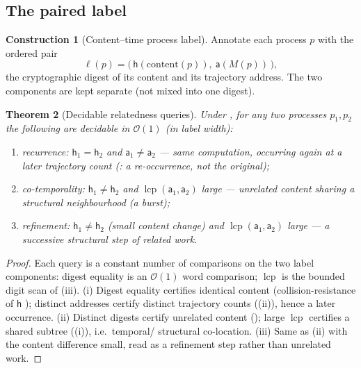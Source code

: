 \documentclass[twocolumn,10pt,a4paper]{article}
\theoremstyle{thmstyle}
\newtheorem{theorem}{Theorem}[section]
\theoremstyle{definition}
\newtheorem{construction}[theorem]{Construction}
\theoremstyle{remark}
\newcommand{\Mcount}{M}
\newcommand{\Addr}{\mathsf{a}}
\newcommand{\dig}{\mathsf{h}}
\newcommand{\lab}{\ell}
\DeclareMathOperator{\lcp}{lcp}
\begin{document}
\subsection{The paired label}

\begin{construction}[Content--time process label]
\label{con:paired}
Annotate each process $p$ with the ordered pair
\[
\lab(p)=\big(\,\dig(\mathrm{content}(p)),\ \Addr(\Mcount(p))\,\big),
\]
the cryptographic digest of its content and its trajectory address. The
two components are kept separate (not mixed into one digest).
\end{construction}

\begin{theorem}[Decidable relatedness queries]
\label{thm:queries}
Under , for any two processes $p_1,p_2$ the following are
decidable in $\mathcal{O}(1)$ (in label width):
\begin{enumerate}[label=\textup{(\roman*)},leftmargin=2.2em,itemsep=2pt]
\item \emph{recurrence:} $\dig_1=\dig_2$ and $\Addr_1\neq\Addr_2$ ---
same computation, occurring again at a later trajectory count
(: a re-occurrence, not the original);
\item \emph{co-temporality:} $\dig_1\neq\dig_2$ and
$\lcp(\Addr_1,\Addr_2)$ large --- unrelated content sharing a structural
neighbourhood (a burst);
\item \emph{refinement:} $\dig_1\neq\dig_2$ (small content change) and
$\lcp(\Addr_1,\Addr_2)$ large --- a successive structural step of related
work.
\end{enumerate}
\end{theorem}

\begin{proof}
Each query is a constant number of comparisons on the two label
components: digest equality is an $\mathcal{O}(1)$ word comparison;
$\lcp$ is the bounded digit scan of (iii). (i) Digest
equality certifies identical content (collision-resistance of $\dig$
\citep{nist180-4,stevens2017}); distinct addresses certify distinct
trajectory counts ((ii)), hence a later occurrence. (ii)
Distinct digests certify unrelated content (); large
$\lcp$ certifies a shared subtree ((i)), i.e.\ temporal/%
structural co-location. (iii) Same as (ii) with the content difference
small, read as a refinement step rather than unrelated work.
\end{proof}
\end{document}
